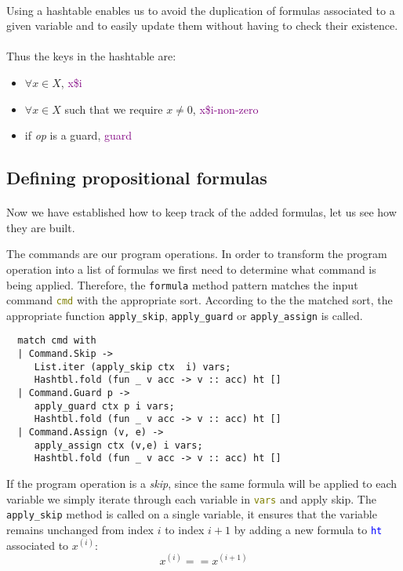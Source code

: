 \documentclass[letterpaper,12pt]{article}
\begin{document}
\paragraph{}
Using a hashtable enables us to avoid the duplication of formulas associated to a given variable and to easily update them without having to check their existence. 
\paragraph{}
Thus the keys in the hashtable are:
\begin{itemize}
\item $\forall x \in X$,  \textcolor{purple}{x\$i}
\item $\forall x \in X$ such that we require $x \neq 0$, \textcolor{purple}{x\$i-non-zero}
\item if \textit{op} is a guard, \textcolor{purple}{guard}
\end{itemize}

\subsection{Defining propositional formulas}
\paragraph{}
Now we have established how to keep track of the added formulas, let us see how they are built.

The commands are our program operations. In order to transform the program operation into a list of formulas we first need to determine what command is being applied.
Therefore, the \texttt{formula} method pattern matches the input command \texttt{\textcolor{olive}{cmd}} with the appropriate sort. According to the the matched sort, the appropriate function \texttt{apply\_skip}, \texttt{apply\_guard} or \texttt{apply\_assign} is called. 


\begin{verbatim}
  match cmd with
  | Command.Skip ->
     List.iter (apply_skip ctx  i) vars;
     Hashtbl.fold (fun _ v acc -> v :: acc) ht []
  | Command.Guard p ->
     apply_guard ctx p i vars;
     Hashtbl.fold (fun _ v acc -> v :: acc) ht []
  | Command.Assign (v, e) ->
     apply_assign ctx (v,e) i vars;
     Hashtbl.fold (fun _ v acc -> v :: acc) ht []
\end{verbatim}

If the program operation is a \textit{skip}, since the same formula will be applied to each variable we simply iterate through each variable in \texttt{\textcolor{olive}{vars}} and apply skip. The \texttt{apply\_skip} method is called on a single variable, it ensures that the variable remains unchanged from index $i$ to index $i+1$ by adding a new formula to \texttt{\textcolor{blue}{ht}} associated to $x^{(i)}$:
$$ x^{(i)} == x^{(i+1)} $$
\end{document}
